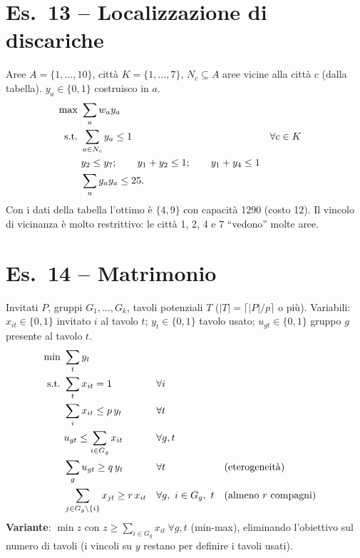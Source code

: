 \section*{Es.\ 13 -- Localizzazione di discariche}
Aree $A=\{1,\dots,10\}$, città $K=\{1,\dots,7\}$, $N_c\subseteq A$ aree vicine alla città $c$ (dalla tabella). $y_a\in\{0,1\}$ costruisco in $a$.
\begin{align*}
\max\ & \sum_aw_ay_a\\
\text{s.t.}\ & \sum_{a\in N_c}y_a\le1 && \forall c\in K\\
& y_2\le y_7;\qquad y_1+y_2\le1;\qquad y_1+y_4\le1\\
& \sum_ag_ay_a\le25.
\end{align*}
Con i dati della tabella l'ottimo è $\{4,9\}$ con capacità 1290 (costo 12). Il vincolo di vicinanza è molto restrittivo: le città 1, 2, 4 e 7 ``vedono'' molte aree.

\section*{Es.\ 14 -- Matrimonio}
Invitati $P$, gruppi $G_1,\dots,G_k$, tavoli potenziali $T$ ($|T|=\lceil|P|/p\rceil$ o più). Variabili: $x_{it}\in\{0,1\}$ invitato $i$ al tavolo $t$; $y_t\in\{0,1\}$ tavolo usato; $u_{gt}\in\{0,1\}$ gruppo $g$ presente al tavolo $t$.
\begin{align*}
\min\ & \sum_ty_t\\
\text{s.t.}\ & \sum_tx_{it}=1 && \forall i\\
& \sum_ix_{it}\le p\,y_t && \forall t\\
& u_{gt}\le\sum_{i\in G_g}x_{it} && \forall g,t\\
& \sum_gu_{gt}\ge q\,y_t && \forall t &&\text{(eterogeneità)}\\
& \sum_{j\in G_g\setminus\{i\}}x_{jt}\ge r\,x_{it} && \forall g,\ i\in G_g,\ t &&\text{(almeno $r$ compagni)}
\end{align*}
\textbf{Variante}: $\min z$ con $z\ge\sum_{i\in G_g}x_{it}\ \forall g,t$ (min-max), eliminando l'obiettivo sul numero di tavoli (i vincoli su $y$ restano per definire i tavoli usati).

